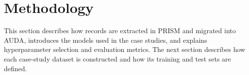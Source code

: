 \section{Methodology}

This section describes how records are extracted in PRISM and migrated into AUDA, introduces the models used in the case studies, and explains hyperparameter selection and evaluation metrics.
The next section describes how each case-study dataset is constructed and how its training and test sets are defined.







